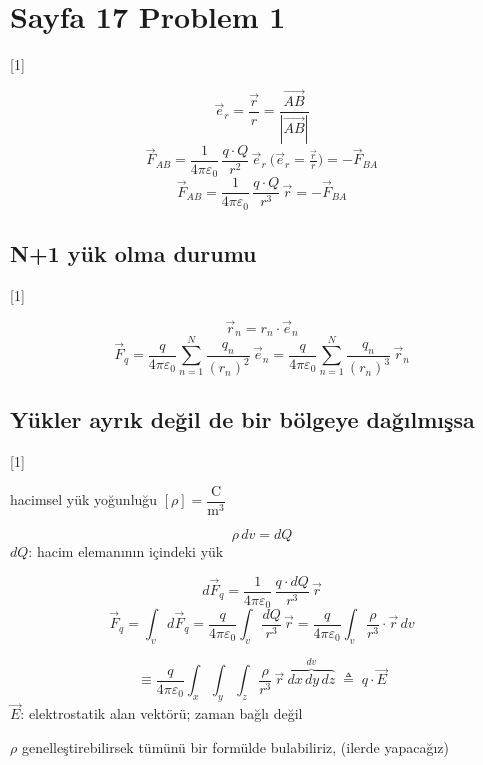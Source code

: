 \documentclass[11pt,a4paper]{article}
\begin{document}

\section{Sayfa 17 Problem 1}

[1]

\[ \vec e_r = \frac{\vec r}{r} = \frac{\overrightarrow{AB}}{|\overrightarrow{AB}|} \]
\[ \vec F_{AB} = \frac{1}{4\pi\varepsilon_0}\,\frac{q\cdot Q}{r^2}\,\vec e_r\ \bigl(\vec e_r = \tfrac{\vec r}{r}\bigr) = -\vec F_{BA} \]
\[ \vec F_{AB} = \frac{1}{4\pi\varepsilon_0}\,\frac{q\cdot Q}{r^3}\,\vec r = -\vec F_{BA} \]

\subsection{N+1 yük olma durumu}

[1]

\[ \vec r_n = r_n\cdot\vec e_n \]
\[ \vec F_q = \frac{q}{4\pi\varepsilon_0}\sum_{n=1}^{N}\frac{q_n}{(r_n)^2}\,\vec e_n = \frac{q}{4\pi\varepsilon_0}\sum_{n=1}^{N}\frac{q_n}{(r_n)^{3}}\,\vec r_n \]

\subsection{Yükler ayrık değil de bir bölgeye dağılmışsa}

[1]

\noindent hacimsel yük yoğunluğu $[\rho] = \dfrac{\mathrm{C}}{\mathrm{m}^3}$

\[ \rho\,dv = dQ \]
\noindent $dQ$: hacim elemanının içindeki yük

\[ d\vec F_q = \frac{1}{4\pi\varepsilon_0}\,\frac{q\cdot dQ}{r^3}\,\vec r \]
\[ \vec F_q = \int_v d\vec F_q = \frac{q}{4\pi\varepsilon_0}\int_v \frac{dQ}{r^3}\,\vec r = \frac{q}{4\pi\varepsilon_0}\int_v \frac{\rho}{r^3}\cdot\vec r\,dv \]

\[ \equiv \frac{q}{4\pi\varepsilon_0}\int_x\int_y\int_z \frac{\rho}{r^3}\,\vec r\ \overbrace{dx\,dy\,dz}^{dv} \;\triangleq\; q\cdot\vec E \]
\noindent $\vec E$: elektrostatik alan vektörü; \okunamadi{} zaman bağlı değil

\noindent $\rho$ genelleştirebilirsek tümünü bir formülde bulabiliriz, (ilerde yapacağız)
\end{document}
